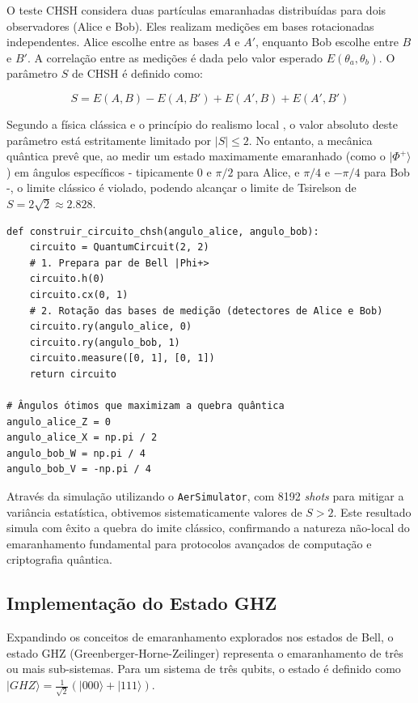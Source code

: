 \documentclass[12pt, a4paper]{article}
\newcommand{\ket}[1]{\lvert #1 \rangle}
\begin{document}
O teste CHSH considera duas partículas emaranhadas distribuídas para dois observadores (Alice e Bob). Eles realizam medições em bases rotacionadas independentes. Alice escolhe entre as bases $A$ e $A'$, enquanto Bob escolhe entre $B$ e $B'$. A correlação entre as medições é dada pelo valor esperado $E(\theta_a, \theta_b)$. O parâmetro $S$ de CHSH é definido como:

\begin{equation}
    S = E(A, B) - E(A, B') + E(A', B) + E(A', B')
\end{equation}

Segundo a física clássica e o princípio do realismo local \cite{nielsen2010}, o valor absoluto deste parâmetro está estritamente limitado por $|S| \le 2$. No entanto, a mecânica quântica prevê que, ao medir um estado maximamente emaranhado (como o
$\ket{\Phi^+}$) em ângulos específicos - tipicamente $0$ e $\pi/2$ para Alice, e $\pi/4$ e $-\pi/4$ para Bob -, o limite clássico é violado, podendo alcançar o limite de Tsirelson de $S = 2\sqrt{2} \approx 2.828$.

\begin{lstlisting}[caption={Implementação do teste experimental da Desigualdade CHSH simulando a rotação de bases independentes.}]
def construir_circuito_chsh(angulo_alice, angulo_bob):
    circuito = QuantumCircuit(2, 2)
    # 1. Prepara par de Bell |Phi+>
    circuito.h(0)
    circuito.cx(0, 1)
    # 2. Rotação das bases de medição (detectores de Alice e Bob)
    circuito.ry(angulo_alice, 0)
    circuito.ry(angulo_bob, 1)
    circuito.measure([0, 1], [0, 1])
    return circuito

# Ângulos ótimos que maximizam a quebra quântica
angulo_alice_Z = 0
angulo_alice_X = np.pi / 2
angulo_bob_W = np.pi / 4
angulo_bob_V = -np.pi / 4
\end{lstlisting}

Através da simulação utilizando o \texttt{AerSimulator}, com 8192 \textit{shots} para mitigar a variância estatística, obtivemos sistematicamente valores de $S > 2$. Este resultado simula com êxito a quebra do imite clássico, confirmando a natureza não-local do emaranhamento fundamental para protocolos avançados de computação e criptografia quântica.

\subsection{Implementação do Estado GHZ}

Expandindo os conceitos de emaranhamento explorados nos estados de Bell, o estado GHZ (Greenberger-Horne-Zeilinger) representa o emaranhamento de três ou mais sub-sistemas. Para um sistema de três qubits, o estado é definido como $\ket{GHZ} = \frac{1}{\sqrt{2}}(\ket{000} + \ket{111})$.
\end{document}
